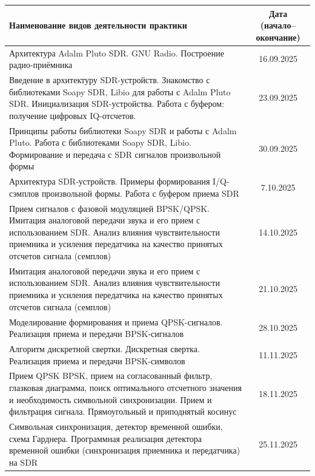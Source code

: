 \begin{center}
\begin{tabular}{|p{10.8cm}|c|}
\hline
\textbf{Наименование видов деятельности практики} & \textbf{Дата (начало–окончание)}\\

\hline
Архитектура Adalm Pluto SDR. GNU Radio. Построение радио-приёмника & 16.09.2025\\

\hline
Введение в архитектуру SDR-устройств. Знакомство с библиотеками Soapy SDR, Libio для работы с Adalm Pluto SDR. 
Инициализация SDR-устройства. Работа с буфером: получение цифровых IQ-отсчетов. & 23.09.2025\\

\hline
Принципы работы библиотеки Soapy SDR и работы с Adalm Pluto. Работа с библиотеками Soapy SDR, Libio. 
Формирование и передача с SDR сигналов произвольной формы & 30.09.2025\\

\hline
Архитектура SDR-устройств. Примеры формирования I/Q-сэмплов произвольной формы. Работа с буфером приема SDR & 7.10.2025\\

\hline
Прием сигналов с фазовой модуляцией BPSK/QPSK. Имитация аналоговой передачи звука и его прием с использованием SDR. 
Анализ влияния чувствительности приемника и усиления передатчика на качество принятых отсчетов сигнала (семплов) & 14.10.2025\\

\hline
Имитация аналоговой передачи звука и его прием с использованием SDR. Анализ влияния чувствительности приемника и усиления 
передатчика на качество принятых отсчетов сигнала (семплов) & 21.10.2025\\
\hline

\hline
Моделирование формирования и приема QPSK-сигналов. Реализация приема и передачи BPSK-сигналов & 28.10.2025\\
\hline

\hline
Алгоритм дискретной свертки. Дискретная свертка. Реализация приема и передачи BPSK-символов & 11.11.2025\\
\hline

\hline
Прием QPSK BPSK, прием на согласованный фильтр, глазковая диаграмма, 
поиск оптимального отсчетного значения и необходимость символьной синхронизации. Прием и фильтрация сигнала. 
Прямоугольный и приподнятый косинус & 18.11.2025\\
\hline

\hline
Символьная синхронизация, детектор временной ошибки, схема Гарднера. Программная реализация детектора временной ошибки 
(синхронизация приемника и передатчика) на SDR & 25.11.2025\\
\hline
\end{tabular}
\end{center}

